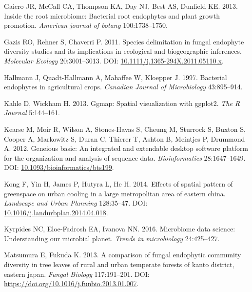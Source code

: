 \documentclass[fleqn,10pt,lineno]{wlpeerj} %
\newlength{\cslhangindent}
\newenvironment{CSLReferences}[2] %
 {%
  \setlength{\parindent}{0pt}
  \ifodd #1 \everypar{\setlength{\hangindent}{\cslhangindent}}\ignorespaces\fi
  \ifnum #2 > 0
  \setlength{\parskip}{#2\baselineskip}
  \fi
 }%
 {}
\begin{document}
\begin{CSLReferences}{1}{0}
\leavevmode{}%
Gaiero JR, McCall CA, Thompson KA, Day NJ, Best AS, Dunfield KE. 2013. Inside the root microbiome: Bacterial root endophytes and plant growth promotion. \emph{American journal of botany} 100:1738--1750.

\leavevmode{}%
Gazis RO, Rehner S, Chaverri P. 2011. Species delimitation in fungal endophyte diversity studies and its implications in ecological and biogeographic inferences. \emph{Molecular Ecology} 20:3001--3013. DOI: \href{https://doi.org/10.1111/j.1365-294X.2011.05110.x}{10.1111/j.1365-294X.2011.05110.x}.

\leavevmode{}%
Hallmann J, Quadt-Hallmann A, Mahaffee W, Kloepper J. 1997. Bacterial endophytes in agricultural crops. \emph{Canadian Journal of Microbiology} 43:895--914.

\leavevmode{}%
Kahle D, Wickham H. 2013. Ggmap: Spatial visualization with ggplot2. \emph{The R Journal} 5:144--161.

\leavevmode{}%
Kearse M, Moir R, Wilson A, Stones-Havas S, Cheung M, Sturrock S, Buxton S, Cooper A, Markowitz S, Duran C, Thierer T, Ashton B, Meintjes P, Drummond A. 2012. Geneious basic: An integrated and extendable desktop software platform for the organization and analysis of sequence data. \emph{Bioinformatics} 28:1647--1649. DOI: \href{https://doi.org/10.1093/bioinformatics/bts199}{10.1093/bioinformatics/bts199}.

\leavevmode{}%
Kong F, Yin H, James P, Hutyra L, He H. 2014. Effects of spatial pattern of greenspace on urban cooling in a large metropolitan area of eastern china. \emph{Landscape and Urban Planning} 128:35--47. DOI: \href{https://doi.org/10.1016/j.landurbplan.2014.04.018}{10.1016/j.landurbplan.2014.04.018}.

\leavevmode{}%
Kyrpides NC, Eloe-Fadrosh EA, Ivanova NN. 2016. Microbiome data science: Understanding our microbial planet. \emph{Trends in microbiology} 24:425--427.

\leavevmode{}%
Matsumura E, Fukuda K. 2013. A comparison of fungal endophytic community diversity in tree leaves of rural and urban temperate forests of kanto district, eastern japan. \emph{Fungal Biology} 117:191--201. DOI: \url{https://doi.org/10.1016/j.funbio.2013.01.007}.


\end{CSLReferences}
\end{document}
